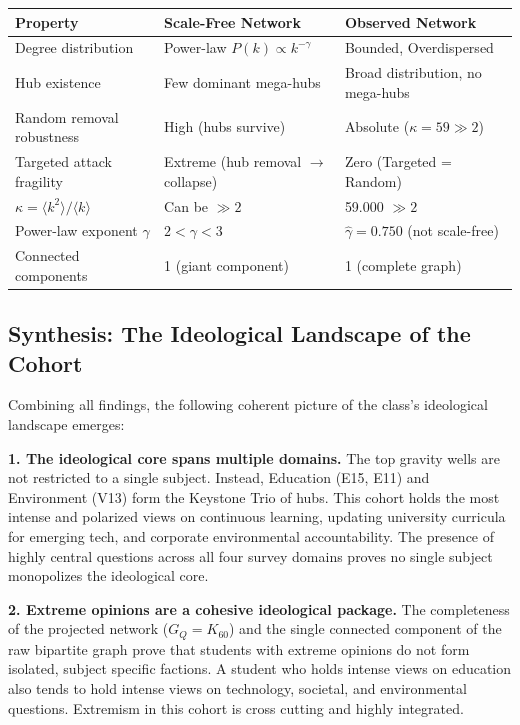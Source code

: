 \documentclass[11pt, a4paper]{article}
\begin{document}
\begin{center}
\begin{tabular}{lll}
\toprule
\textbf{Property} & \textbf{Scale-Free Network} & \textbf{Observed Network} \\
\midrule
Degree distribution & Power-law $P(k) \propto k^{-\gamma}$ & Bounded, Overdispersed \\
Hub existence & Few dominant mega-hubs & Broad distribution, no mega-hubs \\
Random removal robustness & High (hubs survive) & Absolute ($\kappa = 59 \gg 2$) \\
Targeted attack fragility & Extreme (hub removal $\to$ collapse) & Zero (Targeted = Random) \\
$\kappa = \langle k^2 \rangle / \langle k \rangle$ & Can be $\gg 2$ & 59.000 $\gg 2$ \\
Power-law exponent $\gamma$ & $2 < \gamma < 3$ & $\hat{\gamma} = 0.750$ (not scale-free) \\
Connected components & 1 (giant component) & 1 (complete graph) \\
\bottomrule
\end{tabular}
\end{center}

\subsection{Synthesis: The Ideological Landscape of the Cohort}

Combining all findings, the following coherent picture of the class's ideological landscape emerges:

\textbf{1. The ideological core spans multiple domains.} The top gravity wells are not restricted to a single subject. Instead, Education (E15, E11) and Environment (V13) form the Keystone Trio of hubs. This cohort holds the most intense and polarized views on continuous learning, updating university curricula for emerging tech, and corporate environmental accountability. The presence of highly central questions across all four survey domains proves no single subject monopolizes the ideological core.

\textbf{2. Extreme opinions are a cohesive ideological package.} The completeness of the projected network ($G_Q = K_{60}$) and the single connected component of the raw bipartite graph prove that students with extreme opinions do not form isolated, subject specific factions. A student who holds intense views on education also tends to hold intense views on technology, societal, and environmental questions. Extremism in this cohort is cross cutting and highly integrated.
\end{document}
